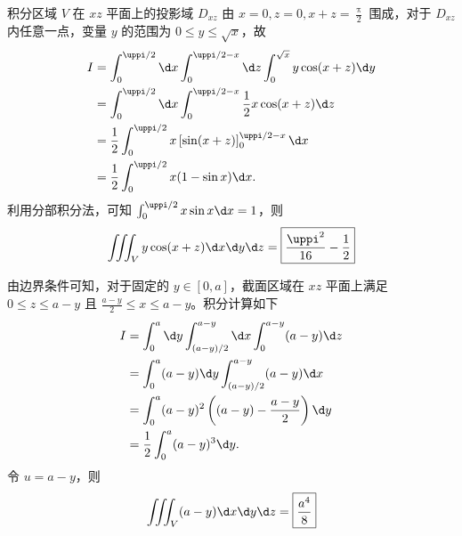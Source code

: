 \begin{solution}
    积分区域 $V$ 在 $xz$ 平面上的投影域 $D_{xz}$ 由 $x=0, z=0, x+z=\frac{\uppi}{2}$ 围成，对于 $D_{xz}$ 内任意一点，变量 $y$ 的范围为 $0 \le y \le \sqrt{x}$，故
    \begin{equation}
        \begin{aligned}
            I & = \int_0^{\uppi/2} \d x \int_0^{\uppi/2 - x} \d z \int_0^{\sqrt{x}} y \cos(x + z) \d y \\
              & = \int_0^{\uppi/2} \d x \int_0^{\uppi/2 - x} \frac{1}{2}x \cos(x + z) \d z             \\
              & = \frac{1}{2} \int_0^{\uppi/2} x \left[ \sin(x + z) \right]_0^{\uppi/2 - x} \d x       \\
              & = \frac{1}{2} \int_0^{\uppi/2} x (1 - \sin x) \d x.
        \end{aligned}
    \end{equation}
    利用分部积分法，可知 $\int_0^{\uppi/2} x \sin x \d x = 1$，则
    \begin{equation}
        \iiint_V y \cos(x + z) \d x \d y \d z = \boxed{\frac{\uppi^2}{16} - \frac{1}{2}}
    \end{equation}

    由边界条件可知，对于固定的 $y \in [0, a]$，截面区域在 $xz$ 平面上满足 $0 \le z \le a - y$ 且 $\frac{a-y}{2} \le x \le a - y$。积分计算如下
    \begin{equation}
        \begin{aligned}
            I & = \int_0^a \d y \int_{(a-y)/2}^{a-y} \d x \int_0^{a-y} (a-y) \d z \\
              & = \int_0^a (a-y) \d y \int_{(a-y)/2}^{a-y} (a-y) \d x             \\
              & = \int_0^a (a-y)^2 \left( (a-y) - \frac{a-y}{2} \right) \d y      \\
              & = \frac{1}{2} \int_0^a (a-y)^3 \d y.
        \end{aligned}
    \end{equation}
    令 $u = a - y$，则
    \begin{equation}
        \iiint_V (a - y) \d x \d y \d z = \boxed{\frac{a^4}{8}}
    \end{equation}
\end{solution}


